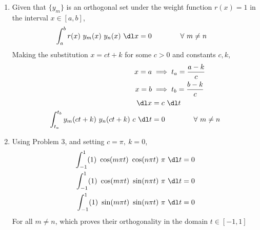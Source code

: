 \begin{enumerate}
    \item Given that $ \{y_m\} $ is an orthogonal set under the weight function $ r(x)
              = 1 $ in the interval $ x \in [a,b] $,
          \begin{align}
              \int_{a}^{b} r(x)\ y_m(x)\ y_n(x)\ \dl x & =
              0 \qquad\qquad \forall\ m \neq n
          \end{align}
          Making the substitution $ x = ct + k $ for some $ c > 0 $ and constants
          $ c, k $,
          \begin{align}
              x = a                   & \implies t_a = \frac{a-k}{c}       \\
              x = b                   & \implies t_b = \frac{b-k}{c}       \\
              \dl x                   & = c\ \dl t                         \\
              \int_{t_a}^{t_b} y_m(ct+ k)
              \ y_n(ct + k)\ c\ \dl t & = 0 \qquad\qquad \forall\ m \neq n
          \end{align}

    \item Using Problem $ 3 $, and setting $ c = \pi,\ k = 0 $,
          \begin{align}
              \int_{-1}^{1} (1)\ \cos(m\pi t)\ \cos(n\pi t)\ \pi\ \dl t & = 0 \\
              \int_{-1}^{1} (1)\ \cos(m\pi t)\ \sin(n\pi t)\ \pi\ \dl t & = 0 \\
              \int_{-1}^{1} (1)\ \sin(m\pi t)\ \sin(n\pi t)\ \pi\ \dl t & = 0
          \end{align}
          For all $ m \neq n $, which proves their orthogonality in the domain
          $ t \in [-1, 1] $


\end{enumerate}
